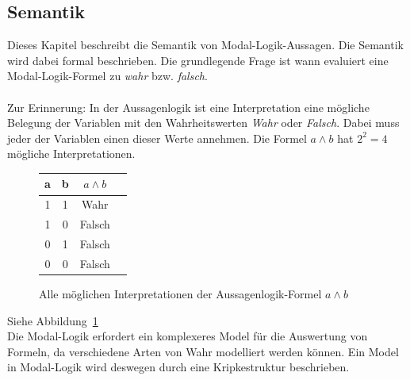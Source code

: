 
\subsection{Semantik} %
\label{sec:semantik}
Dieses Kapitel beschreibt die Semantik von Modal-Logik-Aussagen. 
Die Semantik wird dabei formal beschrieben. Die grundlegende Frage ist wann evaluiert eine Modal-Logik-Formel zu \emph{wahr} bzw. \emph{falsch}.\\
\\
Zur Erinnerung: In der Aussagenlogik ist eine Interpretation eine mögliche Belegung der Variablen mit den Wahrheitswerten \emph{Wahr} oder \emph{Falsch}. Dabei muss jeder der Variablen einen dieser Werte annehmen. Die Formel $a \wedge b$ hat $2^2 = 4$ mögliche Interpretationen. 
\begin{figure}[ht]
	\begin{center}
		\begin{tabular}{cccc}
		\hline
		a & b & $a \wedge b$\\
		\hline
		1 & 1 & Wahr\\
		\hline
		1 & 0 & Falsch\\
		\hline
		0 & 1 & Falsch\\
		\hline
		0 & 0 & Falsch\\
		\hline
		\end{tabular}
		\caption{Alle möglichen Interpretationen der Aussagenlogik-Formel $a \wedge b$}
		\label{tab:AussagenlogikInterpretation}
	\end{center}
\end{figure}
Siehe Abbildung~\ref{tab:AussagenlogikInterpretation}
\cite{hunter1973metalogic}%
\\
Die Modal-Logik erfordert ein komplexeres Model für die Auswertung von Formeln, da verschiedene Arten von Wahr modelliert werden können.\cite[S.308f]{huth2004logic}
Ein Model in Modal-Logik wird deswegen durch eine Kripkestruktur beschrieben. 

